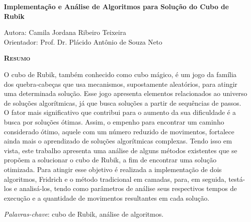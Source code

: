 \begin{center}
	{\Large{\textbf{Implementação e Análise de Algoritmos para Solução do Cubo de Rubik}}}
\end{center}

\vspace{1cm}

\begin{flushright}
	Autora: Camila Jordana Ribeiro Teixeira\\
	Orientador: Prof. Dr. Plácido Antônio de Souza Neto
\end{flushright}

\vspace{1cm}

\begin{center}
	\Large{\textsc{\textbf{Resumo}}}
\end{center}

\noindent O cubo de Rubik, também conhecido como cubo mágico, é um jogo da família dos quebra-cabeças que usa mecanismos, supostamente aleatórios, para atingir uma determinada solução. Esse jogo apresenta elementos relacionados ao universo de soluções algorítmicas, já que busca soluções a partir de sequências de passos. O fator mais significativo que contribui para o aumento da sua dificuldade é a busca por soluções ótimas. Assim, o empenho para encontrar um caminho considerado ótimo, aquele com um número reduzido de movimentos, fortalece ainda mais o aprendizado de soluções algorítmicas complexas. Tendo isso em vista, este trabalho apresenta uma análise de alguns métodos existentes que se propõem a solucionar o cubo de Rubik, a fim de encontrar uma solução otimizada. Para atingir esse objetivo é realizada a implementação de dois algoritmos, Fridrich e o método tradicional em camadas, para, em seguida, testá-los e analisá-los, tendo como parâmetros de análise seus respectivos tempos de execução e a quantidade de movimentos resultantes em cada solução.

\noindent\textit{Palavras-chave}: cubo de Rubik, análise de algoritmos.